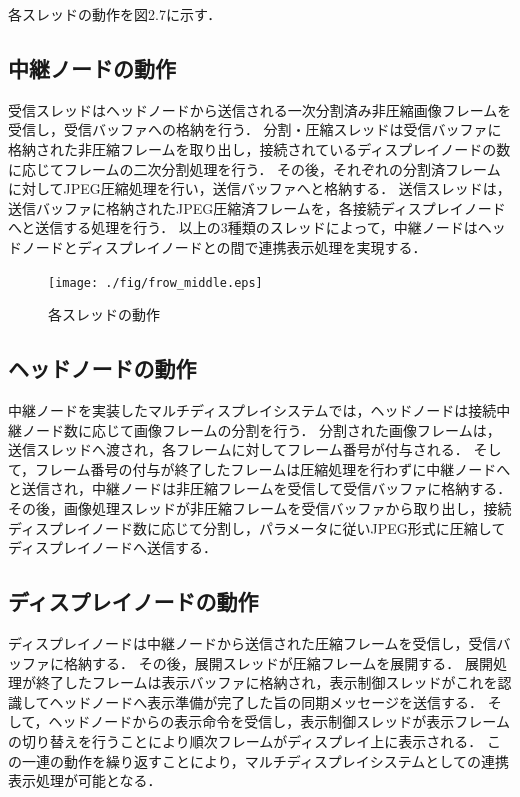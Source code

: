 各スレッドの動作を図2.7に示す．

\subsection*{中継ノードの動作}
受信スレッドはヘッドノードから送信される一次分割済み非圧縮画像フレームを受信し，受信バッファへの格納を行う．
分割・圧縮スレッドは受信バッファに格納された非圧縮フレームを取り出し，接続されているディスプレイノードの数に応じてフレームの二次分割処理を行う．
その後，それぞれの分割済フレームに対してJPEG圧縮処理を行い，送信バッファへと格納する．
送信スレッドは，送信バッファに格納されたJPEG圧縮済フレームを，各接続ディスプレイノードへと送信する処理を行う．
以上の3種類のスレッドによって，中継ノードはヘッドノードとディスプレイノードとの間で連携表示処理を実現する．

\begin{figure}[H]
  \hspace*{\fill}
  \texttt{[image: ./fig/frow\_middle.eps]}
  \hspace*{\fill}
  \caption{各スレッドの動作}
\end{figure}

\subsection*{ヘッドノードの動作}
中継ノードを実装したマルチディスプレイシステムでは，ヘッドノードは接続中継ノード数に応じて画像フレームの分割を行う．
分割された画像フレームは，送信スレッドへ渡され，各フレームに対してフレーム番号が付与される．
そして，フレーム番号の付与が終了したフレームは圧縮処理を行わずに中継ノードへと送信され，中継ノードは非圧縮フレームを受信して受信バッファに格納する．
その後，画像処理スレッドが非圧縮フレームを受信バッファから取り出し，接続ディスプレイノード数に応じて分割し，パラメータに従いJPEG形式に圧縮してディスプレイノードへ送信する．

\subsection*{ディスプレイノードの動作}
ディスプレイノードは中継ノードから送信された圧縮フレームを受信し，受信バッファに格納する．
その後，展開スレッドが圧縮フレームを展開する．
展開処理が終了したフレームは表示バッファに格納され，表示制御スレッドがこれを認識してヘッドノードへ表示準備が完了した旨の同期メッセージを送信する．
そして，ヘッドノードからの表示命令を受信し，表示制御スレッドが表示フレームの切り替えを行うことにより順次フレームがディスプレイ上に表示される．
この一連の動作を繰り返すことにより，マルチディスプレイシステムとしての連携表示処理が可能となる．

